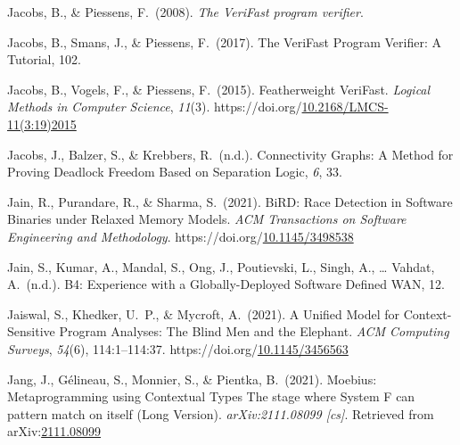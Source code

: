 \documentclass[12pt,twoside]{article}
\begin{document}
{\begin{thebibliography}{1079}
\mdbibitemlabel{}Jacobs, B., \& Piessens, F.~(2008). \emph{The VeriFast program verifier}.%

\mdbibitemlabel{}Jacobs, B., Smans, J., \& Piessens, F.~(2017). The VeriFast Program Veriﬁer: A Tutorial, 102.%

\mdbibitemlabel{}Jacobs, B., Vogels, F., \& Piessens, F.~(2015). Featherweight VeriFast. \emph{Logical Methods in Computer Science}, \emph{11}(3). https://doi.org/\href{https://dx.doi.org/10.2168/LMCS-11\%25283:19\%25292015}{10.2168/LMCS-11(3:19)2015}%

\mdbibitemlabel{}Jacobs, J., Balzer, S., \& Krebbers, R.~(n.d.). Connectivity Graphs: A Method for Proving Deadlock Freedom Based on Separation Logic, \emph{6}, 33.%

\mdbibitemlabel{}Jain, R., Purandare, R., \& Sharma, S.~(2021). BiRD: Race Detection in Software Binaries under Relaxed Memory Models. \emph{ACM Transactions on Software Engineering and Methodology}. https://doi.org/\href{https://dx.doi.org/10.1145/3498538}{10.1145/3498538}%

\mdbibitemlabel{}Jain, S., Kumar, A., Mandal, S., Ong, J., Poutievski, L., Singh, A., … Vahdat, A.~(n.d.). B4: Experience with a Globally-Deployed Software Deﬁned WAN, 12.%

\mdbibitemlabel{}Jaiswal, S., Khedker, U.~P., \& Mycroft, A.~(2021). A Unified Model for Context-Sensitive Program Analyses: The Blind Men and the Elephant. \emph{ACM Computing Surveys}, \emph{54}(6), 114:1–114:37. https://doi.org/\href{https://dx.doi.org/10.1145/3456563}{10.1145/3456563}%

\mdbibitemlabel{}Jang, J., Gélineau, S., Monnier, S., \& Pientka, B.~(2021). Moebius: Metaprogramming using Contextual Types \textendash{} The stage where System F can pattern match on itself (Long Version). \emph{arXiv:2111.08099 {}[cs]}. Retrieved from arXiv:\href{http://arxiv.org/abs/2111.08099}{2111.08099}%


\end{thebibliography}}
\end{document}
